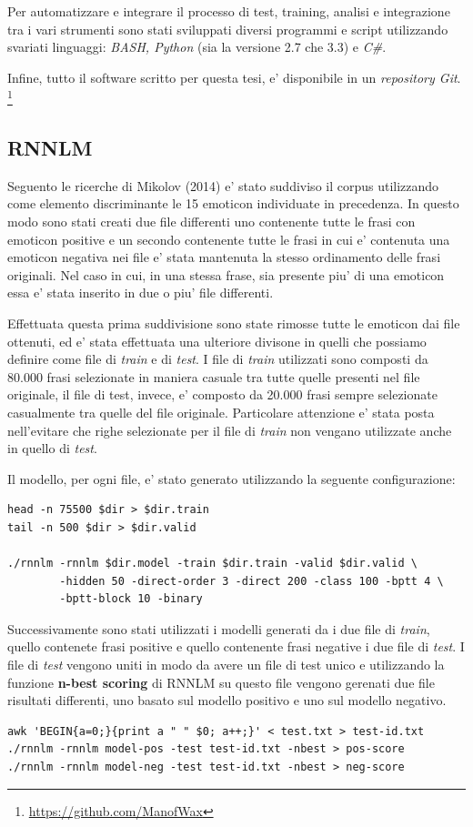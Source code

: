 \documentclass[a4paper,12pt,openright,twoside]{report}
\theoremstyle{definition}
\begin{document}
Per automatizzare e integrare il processo di test, training, analisi e integrazione tra i vari strumenti
sono stati sviluppati diversi programmi e script utilizzando svariati linguaggi: \emph{BASH, Python} (sia 
la versione 2.7 che 3.3) e \emph{C\#}.

Infine, tutto il software scritto per questa tesi, e' disponibile in un \emph{repository Git}.
\footnote{\url{https://github.com/ManofWax}}

\subsection{RNNLM}
\label{sss:rnnlm}
Seguento le ricerche di Mikolov (2014) %
e' stato suddiviso il corpus utilizzando come elemento discriminante le 15 emoticon individuate in precedenza.
In questo modo
sono stati creati due file differenti uno contenente tutte le frasi con emoticon positive e un secondo contenente
tutte le frasi in cui e' contenuta una emoticon negativa nei file e' stata mantenuta la stesso ordinamento delle frasi originali.
Nel caso in cui, in una stessa frase, sia presente piu' di una emoticon essa e' stata inserito in due o piu' file
differenti.

Effettuata questa prima suddivisione sono state rimosse tutte le emoticon dai file ottenuti, ed e' stata effettuata 
una ulteriore divisone in quelli che possiamo definire come file di \emph{train} e di \emph{test}.
I file di \emph{train} utilizzati sono composti da 80.000 frasi selezionate in maniera casuale tra tutte quelle presenti nel file originale,
il file di test, invece, e' composto da 20.000 frasi sempre selezionate casualmente tra quelle del file originale.
Particolare attenzione e' stata posta nell'evitare che righe selezionate per il file di \emph{train}
non vengano utilizzate anche in quello di \emph{test}.

Il modello, per ogni file, e' stato generato utilizzando la seguente configurazione:

\begin{verbatim}
head -n 75500 $dir > $dir.train
tail -n 500 $dir > $dir.valid

./rnnlm -rnnlm $dir.model -train $dir.train -valid $dir.valid \
        -hidden 50 -direct-order 3 -direct 200 -class 100 -bptt 4 \
        -bptt-block 10 -binary
\end{verbatim}

Successivamente sono stati utilizzati i modelli generati da i due file di \emph{train}, quello contenete
frasi positive e quello contenente frasi negative i due file di \emph{test}. I file di \emph{test}
vengono uniti in modo da avere un file di test unico e utilizzando la funzione \textbf{n-best scoring} di RNNLM
su questo file vengono gerenati due file risultati differenti, uno basato sul
modello positivo e uno sul modello negativo.
\begin{verbatim}
awk 'BEGIN{a=0;}{print a " " $0; a++;}' < test.txt > test-id.txt
./rnnlm -rnnlm model-pos -test test-id.txt -nbest > pos-score
./rnnlm -rnnlm model-neg -test test-id.txt -nbest > neg-score
\end{verbatim}
\end{document}
